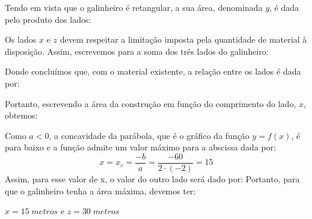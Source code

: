 \documentclass[../main.tex]{subfiles}
\begin{document}
\begin{resol}
     Tendo em vista que o galinheiro é retangular,  a sua área,  denominada $y$, é dada pelo produto dos lados:
  
  Os lados $x$ e $z$ devem respeitar a limitação imposta pela quantidade 
de material à disposição.
 Assim, escrevemos para a soma dos três lados do galinheiro:
  
  Donde concluímos que,  com o material existente,
 a relação entre os lados é dada por:
 
  Portanto,  escrevendo a área da construção em função do comprimento do lado,  $x$, obtemos:
 
Como $a < 0$,  a concavidade da parábola,  que é o gráfico da função $y = f( x )$, 
 é para baixo e a função admite um valor máximo para a abscissa dada por:
 $$x=x_v=\frac{-b}{a}=\frac{-60}{2\cdot(-2)}=15$$
Assim,  para esse valor de x,  o valor do outro lado será dado por:
Portanto,  para que o galinheiro tenha a área máxima,  devemos ter:\\
\begin{center} $x=15\; metros$ e $z=30\; metros$\end{center}
\end{resol} 
\end{document}

